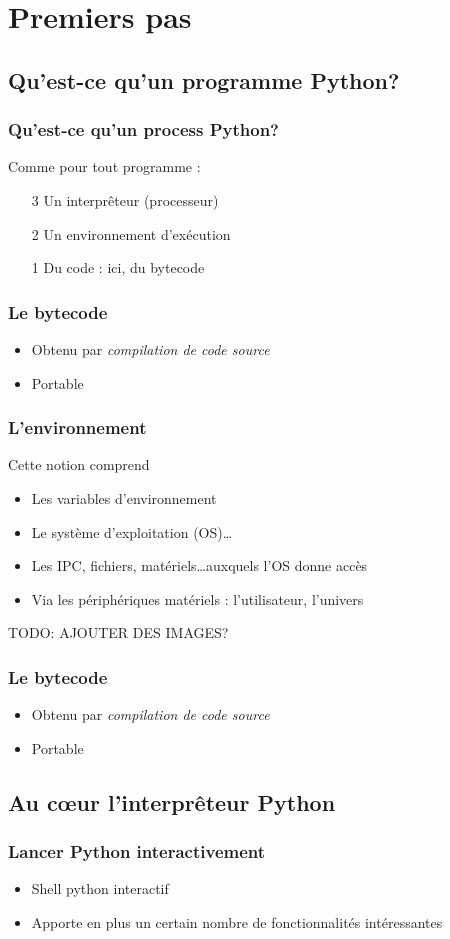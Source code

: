 \section{Premiers pas}

\subsection{Qu'est-ce qu'un programme Python?}
\begin{frame}[fragile]
  \frametitle{Qu'est-ce qu'un process Python?}
  Comme pour tout programme :
  \begin{itemize}
    \item[3] Un interprêteur (processeur)
    \item[2] Un environnement d'exécution
    \item[1] Du code : ici, du bytecode
  \end{itemize}
\end{frame}

\begin{frame}[fragile]
  \frametitle{Le bytecode}
  \begin{itemize}
    \item Obtenu par \em{compilation} de code source
    \item Portable
  \end{itemize}
\end{frame}

\begin{frame}[fragile]
  \frametitle{L'environnement}
  Cette notion comprend
  \begin{itemize}
    \item Les variables d'environnement \pause
    \item Le système d'exploitation (OS)\ldots \pause
    \item Les IPC, fichiers, matériels\ldots auxquels l'OS donne accès \pause
    \item Via les périphériques matériels : l'utilisateur, l'univers
  \end{itemize}
  TODO: AJOUTER DES IMAGES?
\end{frame}

\begin{frame}[fragile]
  \frametitle{Le bytecode}
  \begin{itemize}
    \item Obtenu par \em{compilation} de code source
    \item Portable
  \end{itemize}
\end{frame}


\subsection{Au c\oe ur l'interprêteur Python}
\begin{frame}[fragile]
  \frametitle{Lancer Python interactivement}
  \begin{itemize}
    \item Shell python interactif
    \item Apporte en plus un certain nombre de fonctionnalités intéressantes
  \end{itemize}
\end{frame}

